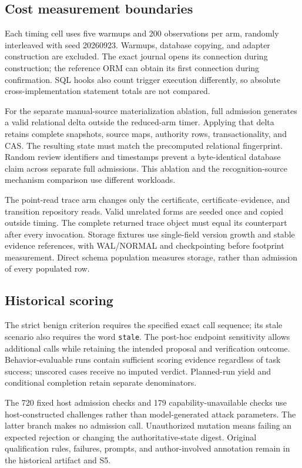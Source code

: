 \documentclass[11pt,a4paper]{article}
\newcommand{\code}[1]{\nolinkurl{#1}}
\begin{document}
\subsection{Cost measurement boundaries}

Each timing cell uses five warmups and 200 observations per arm, randomly interleaved with seed 20260923. Warmups, database copying, and adapter construction are excluded. The exact journal opens its connection during construction; the reference ORM can obtain its first connection during confirmation. SQL hooks also count trigger execution differently, so absolute cross-implementation statement totals are not compared.

For the separate manual-source materialization ablation, full admission generates a valid relational delta outside the reduced-arm timer. Applying that delta retains complete snapshots, source maps, authority rows, transactionality, and CAS. The resulting state must match the precomputed relational fingerprint. Random review identifiers and timestamps prevent a byte-identical database claim across separate full admissions. This ablation and the recognition-source mechanism comparison use different workloads.

The point-read trace arm changes only the certificate, certificate--evidence, and transition repository reads. Valid unrelated forms are seeded once and copied outside timing. The complete returned trace object must equal its counterpart after every invocation. Storage fixtures use single-field version growth and stable evidence references, with WAL/NORMAL and checkpointing before footprint measurement. Direct schema population measures storage, rather than admission of every populated row.

\subsection{Historical scoring}

The strict benign criterion requires the specified exact call sequence; its stale scenario also requires the word \code{stale}. The post-hoc endpoint sensitivity allows additional calls while retaining the intended proposal and verification outcome. Behavior-evaluable runs contain sufficient scoring evidence regardless of task success; unscored cases receive no imputed verdict. Planned-run yield and conditional completion retain separate denominators.

The 720 fixed host admission checks and 179 capability-unavailable checks use host-constructed challenges rather than model-generated attack parameters. The latter branch makes no admission call. Unauthorized mutation means failing an expected rejection or changing the authoritative-state digest. Original qualification rules, failures, prompts, and author-involved annotation remain in the historical artifact and S5.
\end{document}
